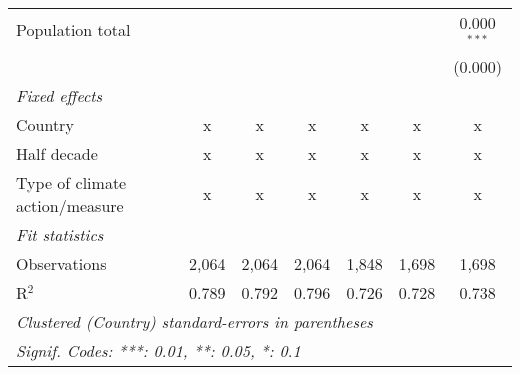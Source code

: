 \begin{tabular}{lcccccc}
   Population total                                                        &         &                &                &                &                & 0.000$^{***}$\\   
                                                                           &         &                &                &                &                & (0.000)\\   
   \emph{Fixed effects}\\
   Country                                                                 & x       & x              & x              & x              & x              & x\\  
   Half decade                                                             & x       & x              & x              & x              & x              & x\\  
   Type of climate action/measure                                          & x       & x              & x              & x              & x              & x\\  
   \midrule \emph{Fit statistics}\\
   Observations                                                            & 2,064   & 2,064          & 2,064          & 1,848          & 1,698          & 1,698\\  
   R$^2$                                                                   & 0.789   & 0.792          & 0.796          & 0.726          & 0.728          & 0.738\\  
   \midrule
   \multicolumn{7}{l}{\emph{Clustered (Country) standard-errors in parentheses}}\\
   \multicolumn{7}{l}{\emph{Signif. Codes: ***: 0.01, **: 0.05, *: 0.1}}\\
\end{tabular}
\par\endgroup


